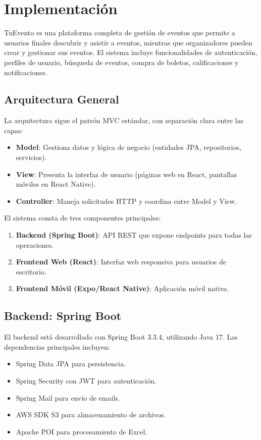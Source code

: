 \section{Implementación}

TuEvento es una plataforma completa de gestión de eventos que permite a usuarios finales descubrir y asistir a eventos, mientras que organizadores pueden crear y gestionar sus eventos. El sistema incluye funcionalidades de autenticación, perfiles de usuario, búsqueda de eventos, compra de boletos, calificaciones y notificaciones.

\subsection{Arquitectura General}
La arquitectura sigue el patrón MVC estándar, con separación clara entre las capas:
\begin{itemize}
\item \textbf{Model}: Gestiona datos y lógica de negocio (entidades JPA, repositorios, servicios).
\item \textbf{View}: Presenta la interfaz de usuario (páginas web en React, pantallas móviles en React Native).
\item \textbf{Controller}: Maneja solicitudes HTTP y coordina entre Model y View.
\end{itemize}

El sistema consta de tres componentes principales:
\begin{enumerate}
\item \textbf{Backend (Spring Boot)}: API REST que expone endpoints para todas las operaciones.
\item \textbf{Frontend Web (React)}: Interfaz web responsiva para usuarios de escritorio.
\item \textbf{Frontend Móvil (Expo/React Native)}: Aplicación móvil nativa.
\end{enumerate}

\subsection{Backend: Spring Boot}
El backend está desarrollado con Spring Boot 3.3.4, utilizando Java 17. Las dependencias principales incluyen:
\begin{itemize}
\item Spring Data JPA para persistencia.
\item Spring Security con JWT para autenticación.
\item Spring Mail para envío de emails.
\item AWS SDK S3 para almacenamiento de archivos.
\item Apache POI para procesamiento de Excel.
\end{itemize}


